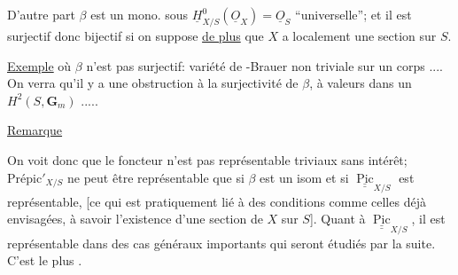 D'autre part $\beta$ est un mono. sous  $\underline H^0_{X/S}(\underline O_X)=\underline O_S$ ``universelle''; et il est surjectif donc bijectif si on suppose \uline{de plus} que  $X$ a localement une section sur $S$.

\uline{Exemple} où $\beta$ n'est pas surjectif: variété de -Brauer non triviale sur un corps .... On verra qu'il y a une obstruction à la surjectivité de $\beta$, à valeurs dans un $H^2(S,\mathbf G_m)$ .....

\uline{Remarque}

On voit donc que le foncteur  n'est pas représentable    triviaux sans intérêt; $\mathrm{Prépic}'_{X/S}$ ne peut être représentable que si $\beta$ est un isom et si $\underline{\underline{\operatorname{Pic}}}_{X/S}$ est représentable,  [ce qui est pratiquement lié à des conditions comme celles déjà envisagées, à savoir l'existence d'une section de $X$ sur $S$]. Quant à $\underline{\underline{\operatorname{Pic}}}_{X/S}$, il est représentable dans des cas généraux importants qui seront étudiés par la suite. C'est  le plus .
